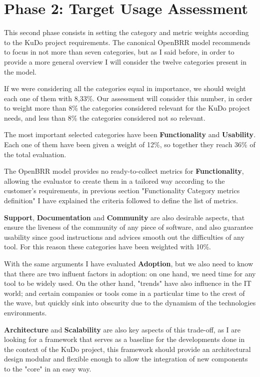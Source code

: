 \documentclass[a4paper,12pt]{book}
\begin{document}
\section{Phase 2: Target Usage Assessment}
\label{sec:phase2}
This second phase consists in setting the category and metric weights according to the KuDo project requirements. The canonical OpenBRR model recommends to focus in not more than seven categories, but as I said before, in order to provide a more general overview I will consider the twelve categories present in the model.

If we were considering all the categories equal in importance, we should weight each one of them with 8,33\%. Our assessment will consider this number, in order to weight more than 8\% the categories considered relevant for the KuDo project needs, and less than 8\% the categories considered not so relevant.

The most important selected categories have been \textbf{Functionality} and \textbf{Usability}. Each one of them have been given a weight of 12\%, so together they reach 36\% of the total evaluation.

The OpenBRR model provides no ready-to-collect metrics for \textbf{Functionality}, allowing the evaluator to create them in a tailored way according to the customer's requirements, in previous section "Functionality Category metrics definition" I have explained the criteria followed to define the list of metrics.

\textbf{Support}, \textbf{Documentation} and \textbf{Community} are also desirable aspects, that ensure the liveness of the community of any piece of software, and also guarantee usability since good instructions and advices smooth out the
difficulties of any tool. For this reason these categories have been
weighted with 10\%. 

With the same arguments I have evaluated \textbf{Adoption}, but we also need to know that there are two influent factors in adoption: on one hand, we need time for any tool to be widely used. On the other hand, "trends" have also influence in the IT world; and certain
companies or tools come in a particular time to the crest of the wave, but quickly sink into obscurity due to the dynamism of the technologies environments. 

\textbf{Architecture}  and \textbf{Scalability} are also key aspects of this trade-off, as I are looking for a framework that serves as a baseline for the developments done in the context of the KuDo project, this framework should provide an architectural design modular and flexible enough to allow the integration of new components to the "core" in an easy way.
\end{document}
